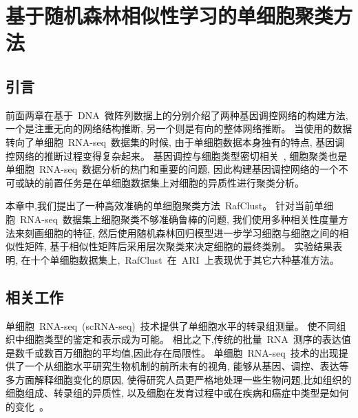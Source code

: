 \section{基于随机森林相似性学习的单细胞聚类方法}
\label{sec:rafclust}

\subsection{引言}

前面两章在基于~DNA~微阵列数据上的分别介绍了两种基因调控网络的构建方法,
一个是注重无向的网络结构推断, 另一个则是有向的整体网络推断。
当使用的数据转向了单细胞~RNA-seq~数据集的时候, 由于单细胞数据本身独有的特点, 基因调控网络的推断过程变得复杂起来。
基因调控与细胞类型密切相关~\cite{Hocker2020.09.11.291724,kang2020learning},
细胞聚类也是单细胞~RNA-seq~数据分析的热门和重要的问题, 
因此构建基因调控网络的一个不可或缺的前置任务是在单细胞数据集上对细胞的异质性进行聚类分析。

本章中,我们提出了一种高效准确的单细胞聚类方法~RafClust。
针对当前单细胞~RNA-seq~数据集上细胞聚类不够准确鲁棒的问题,
我们使用多种相关性度量方法来刻画细胞的特征, 
然后使用随机森林回归模型进一步学习细胞与细胞之间的相似性矩阵,
基于相似性矩阵后采用层次聚类来决定细胞的最终类别。
实验结果表明, 在十个单细胞数据集上,~RafClust~在~ARI~上表现优于其它六种基准方法。

\subsection{相关工作}

单细胞~RNA-seq~(scRNA-seq)~技术提供了单细胞水平的转录组测量。
使不同组织中细胞类型的鉴定和表示成为可能。
相比之下,传统的批量~RNA~测序的表达值是数千或数百万细胞的平均值,因此存在局限性。
单细胞~RNA-seq~技术的出现提供了一个从细胞水平研究生物机制的前所未有的视角,
能够从基因、调控、表达等多方面解释细胞变化的原因,
使得研究人员更严格地处理一些生物问题,比如组织的细胞组成、转录组的异质性,
以及细胞在发育过程中或在疾病和癌症中类型是如何的变化~\cite{kumar2017understanding,patel2014single}。

